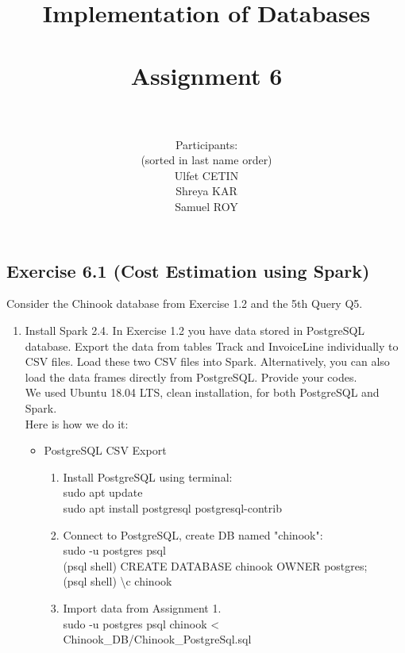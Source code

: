 \documentclass[10pt]{article}
\title{Implementation of Databases \\ ~~~ \\ Assignment 6 \\ ~~~ \\ }
\author{
	Participants:\\
	(sorted in last name order)\\
	Ulfet CETIN\\ 
	Shreya KAR\\
	Samuel ROY\\	
}
\date{}
\begin{document}
	\maketitle
	
	\clearpage
	\subsection*{Exercise 6.1 (Cost Estimation using Spark)}
	
	Consider the Chinook database from Exercise 1.2 and the 5th Query Q5.
	
	\begin{enumerate}
		\item Install Spark 2.4. In Exercise 1.2 you have data stored in PostgreSQL database. Export the
		data from tables Track and InvoiceLine individually to CSV files. Load these two CSV
		files into Spark. Alternatively, you can also load the data frames directly from PostgreSQL.
		Provide your codes.\\
		
		We used Ubuntu 18.04 LTS, clean installation, for both PostgreSQL and Spark.\\
		Here is how we do it:
		
			\begin{itemize}
				\item PostgreSQL CSV Export
					
					
					
					\begin{enumerate}[1.]
						\item Install PostgreSQL using terminal:\\
						sudo apt update\\
						sudo apt install postgresql postgresql-contrib\\
						
						\item Connect to PostgreSQL, create DB named "chinook":\\
						sudo -u postgres psql\\
						(psql shell) CREATE DATABASE chinook OWNER postgres;\\
						(psql shell) \textbackslash c chinook\\
						
						\item Import data from Assignment 1.\\
						sudo -u postgres psql chinook < Chinook\_DB/Chinook\_PostgreSql.sql\\
						

\end{enumerate}
\end{itemize}
\end{enumerate}
\end{document}
